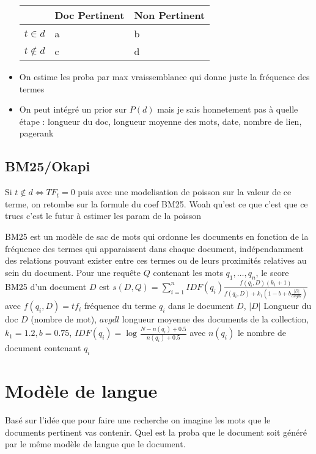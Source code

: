 \documentclass{article}
\begin{document}
\begin{multicols}{2}
\begin{itemize}
    \begin{table}[!ht]
        \centering
        \begin{tabular}{|l|l|l|}
        \hline
            ~ & Doc Pertinent & Non Pertinent \\ \hline
            $t \in d$ & a & b \\ \hline
            $t \not\in d$ & c & d \\ \hline
        \end{tabular}
    \end{table}
    \item On estime les proba par max vraissemblance qui donne juste la fréquence des termes
    \item On peut intégré un prior sur $ P(d) $ mais je sais honnetement pas à quelle étape : longueur du doc, longueur moyenne des mots, date, nombre de lien, pagerank
\end{itemize}

\subsection{BM25/Okapi}
Si $ t \not\in d \Leftrightarrow TF_t = 0 $ puis avec une modelisation de poisson sur la valeur de ce terme, on retombe sur la formule du coef BM25. Woah qu'est ce que c'est que ce trucs c'est le futur à estimer les param de la poisson

BM25 est un modèle de sac de mots qui ordonne les documents en fonction de la fréquence des termes qui apparaissent dans chaque document, indépendamment des relations pouvant exister entre ces termes ou de leurs proximités relatives au sein du document. Pour une requête $ Q $ contenant les mots $ q_1, \dots, q_n $, le score BM25 d'un document $ D $ est $ s(D,Q) = \sum_{i=1}^{n}IDF(q_i) \frac{f(q_i, D) (k_1 + 1)}{f(q_i, D) + k_1 (1 - b + b \frac{\left| D \right| }{avgdl})} $ avec $ f(q_i, D) = tf_i $  fréquence du terme $ q_i $ dans le document $ D $, $ \left| D \right|  $ Longueur du doc $ D $ (nombre de mot), $ avgdl $ longueur moyenne des documents de la collection, $ k_1 = 1.2, b = 0.75 $, $ IDF(q_i) = \log_{} \frac{N - n(q_i) + 0.5}{n(q_i) + 0.5} $ avec $ n(q_i) $ le nombre de document contenant $ q_i $ 
\section{Modèle de langue }
Basé sur l'idée que pour faire une recherche on imagine les mots que le documents pertinent vas contenir. Quel est la proba que le document soit généré par le même modèle de langue que le document.


\end{multicols}
\end{document}
